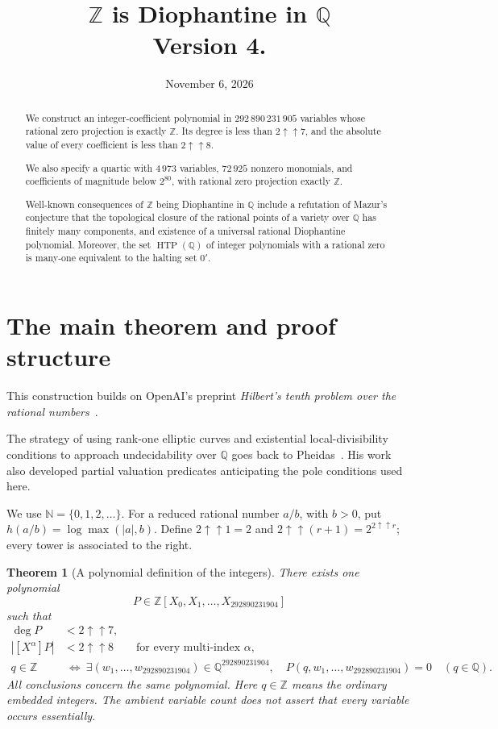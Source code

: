\documentclass[11pt]{article}
\title{$\mathbb{Z}$ is Diophantine in $\mathbb{Q}$\\[4pt]\large Version 4.}
\author{}
\date{November 6, 2026}
\newtheorem{theorem}{Theorem}[section]
\theoremstyle{definition}
\theoremstyle{remark}
\newcommand{\Q}{\mathbb Q}
\newcommand{\Z}{\mathbb Z}
\newcommand{\N}{\mathbb N}
\newcommand{\tw}[1]{2\mathbin{\uparrow\!\uparrow}#1}
\begin{document}
\maketitle
\begin{abstract}
We construct an integer-coefficient polynomial in
$292\,890\,231\,905$ variables whose rational zero projection is exactly
$\Z$. Its degree is less than $2\mathbin{\uparrow\!\uparrow}7$, and the
absolute value of every coefficient is less than
$2\mathbin{\uparrow\!\uparrow}8$.

We also specify a quartic with $4\,973$ variables, $72\,925$ nonzero monomials, and coefficients of magnitude below $2^{80}$,
with rational zero projection exactly $\Z$.

Well-known consequences of $\Z$ being Diophantine in $\Q$ include a refutation of Mazur's conjecture that the topological closure of the rational points of a variety over $\Q$ has finitely many components, and existence of a universal rational Diophantine polynomial. Moreover, the set $\operatorname{HTP}(\Q)$ of integer polynomials with a rational zero is many-one equivalent to the halting set $0'$.
\end{abstract}
\tableofcontents

\section{The main theorem and proof structure}\label{sec:main}
This construction builds on OpenAI's preprint
\emph{Hilbert's tenth problem over the rational numbers}~\cite{openaihtp}.

The strategy of using rank-one elliptic curves and existential
local-divisibility conditions to approach undecidability over $\Q$
goes back to Pheidas~\cite{pheidas2000}. His work also developed
partial valuation predicates anticipating the pole conditions used here.

We use $\N=\{0,1,2,\ldots\}$. For a reduced rational number $a/b$, with
$b>0$, put $h(a/b)=\log\max(|a|,b)$. Define $\tw1=2$ and
$\tw{(r+1)}=2^{\tw r}$; every tower is associated to the right.

\begin{theorem}[A polynomial definition of the integers]\label{thm:target}
There exists one polynomial
\[
 P\in\Z[X_0,X_1,\ldots,X_{292890231904}]
\]
such that
\begin{align*}
 \deg P&<\tw7,\\
 |[X^\alpha]P|&<\tw8\qquad\text{for every multi-index }\alpha,\\
 q\in\Z&\ \Longleftrightarrow\
 \exists(w_1,\ldots,w_{292890231904})\in\Q^{292890231904},\quad
 P(q,w_1,\ldots,w_{292890231904})=0\quad(q\in\Q).
\end{align*}
All conclusions concern the same polynomial. Here $q\in\Z$ means the
ordinary embedded integers. The ambient variable count does not assert that
every variable occurs essentially.
\end{theorem}
\end{document}
